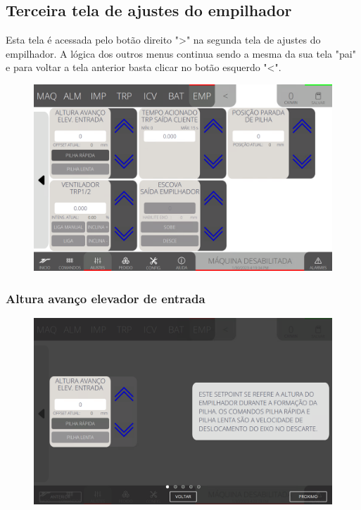 \newpage
\thispagestyle{fancy}
\vspace*{40 pt}
\subsection{Terceira tela de ajustes do empilhador} \label{sec:telaAjustesEmpilhadorTerceiraTela}
Esta tela é acessada pelo botão direito "\textgreater" na segunda tela de ajustes do empilhador. A lógica dos outros menus continua sendo a mesma da sua tela "pai" e para voltar a tela anterior basta clicar no botão esquerdo "\textless{}".
\vspace*{\fill}
\begin{figure}[h]
    \centering
    \includegraphics[width=480 px,height=300 px]{src/imagesICV/08-stacker/settings/Tela-Principal-3.png}
\end{figure}
\vspace*{\fill}

\newpage
\thispagestyle{fancy}
\vspace*{40 pt}
\subsubsection{\small{Altura avanço elevador de entrada}} \label{sec:telaAjustesEmpilhadorAlturaAvancoElevadorEntrada}
\vspace*{\fill}
\begin{figure}[h]
    \centering
    \includegraphics[width=576 px,height=360 px]{src/imagesICV/08-stacker/settings/13.png}
\end{figure}

